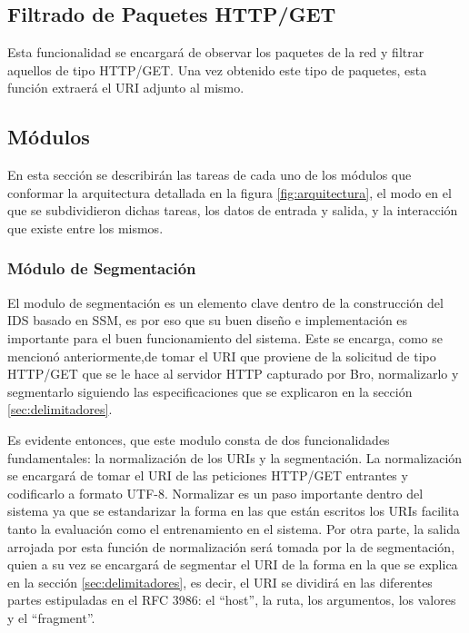 \subsection{Filtrado de Paquetes HTTP/GET}

Esta funcionalidad se encargará de observar los paquetes de la red y filtrar aquellos de tipo HTTP/GET. Una vez obtenido este tipo de paquetes, esta función extraerá el URI adjunto al mismo.

\subsection{Módulos}

En esta sección se describirán las tareas de cada uno de los módulos que conformar la arquitectura detallada en la figura \ref{fig:arquitectura}, el modo en el que se subdividieron dichas tareas, los datos de entrada y salida, y la interacción que existe entre los mismos.

\subsubsection{Módulo de Segmentación}

El modulo de segmentación es un elemento clave dentro de la construcción del IDS basado en SSM, es por eso que su buen diseño e implementación es importante para el buen funcionamiento del sistema. Este se encarga, como se mencionó anteriormente,de tomar el URI que proviene de la solicitud de tipo HTTP/GET que se le hace al servidor HTTP capturado por Bro, normalizarlo y segmentarlo siguiendo las especificaciones que se explicaron en la sección \ref{sec:delimitadores}. 

Es evidente entonces, que este modulo consta de dos funcionalidades fundamentales: la normalización de los URIs y la segmentación.  La normalización se encargará de tomar el URI de las peticiones HTTP/GET entrantes y codificarlo a formato UTF-8. Normalizar es un paso importante dentro del sistema  ya que se estandarizar la forma en las que están escritos los URIs facilita tanto la evaluación como el entrenamiento en el sistema. Por otra parte, la salida arrojada por esta función de normalización será tomada por la de segmentación, quien a su vez se encargará de segmentar el URI de la forma en la que se explica en la sección \ref{sec:delimitadores}, es decir, el URI se dividirá en las diferentes partes estipuladas en el RFC 3986: el ``host'', la ruta, los argumentos, los valores y el ``fragment''.

